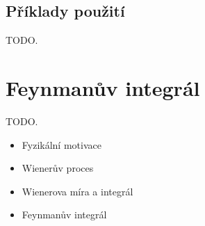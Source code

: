 \documentclass[10pt,a4paper]{report}
\theoremstyle{definition}
\begin{document}
\subsection{Příklady použití}
TODO.

\section{Feynmanův integrál}
TODO.
\begin{itemize}
    \item Fyzikální motivace
    \item Wienerův proces
    \item Wienerova míra a integrál
    \item Feynmanův integrál
\end{itemize}
\end{document}
